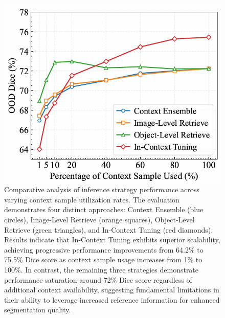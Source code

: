 % 
%
\begin{figure}[t]
  \centering
  \includegraphics[width=0.8\linewidth]{fig/performance_comparison.png}
\caption{Comparative analysis of inference strategy performance across varying context sample utilization rates. The evaluation demonstrates four distinct approaches: Context Ensemble (blue circles), Image-Level Retrieve (orange squares), Object-Level Retrieve (green triangles), and In-Context Tuning (red diamonds). Results indicate that In-Context Tuning exhibits superior scalability, achieving progressive performance improvements from 64.2\% to 75.5\% Dice score as context sample usage increases from 1\% to 100\%. In contrast, the remaining three strategies demonstrate performance saturation around 72\% Dice score regardless of additional context availability, suggesting fundamental limitations in their ability to leverage increased reference information for enhanced segmentation quality.}
  \label{fig:performance_comparison}
\end{figure}
